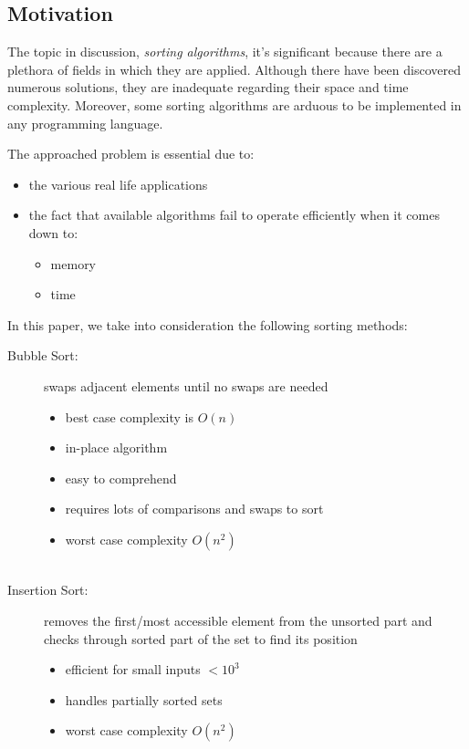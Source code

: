 \documentclass[11pt, letter paper]{article}
\begin{document}
    \subsection{Motivation}
    \label{sec:motiv}
    The topic in discussion, \emph{sorting algorithms}, it's significant because there are a plethora of fields in which they are applied. Although there have been discovered numerous solutions, they are inadequate regarding their space and time complexity. Moreover, some sorting algorithms are arduous to be implemented in any programming language.

    The approached problem is essential due to:
    \renewcommand{\labelitemi}{\ding{43}}
    \renewcommand{\labelitemii}{\ding{45}}
        \begin{itemize}
            \item the various real life applications
            \item the fact that available algorithms fail to operate efficiently when it comes down to:
                \begin{itemize}
                    \item memory
                    \item time
                \end{itemize}
        \end{itemize}

    In this paper, we take into consideration the following sorting methods:
    \begin{description}
        \item[Bubble Sort:] swaps adjacent elements until no swaps are needed
            \begin{itemize}
                \item best case complexity is $O(n)$
                \item in-place algorithm
                \item easy to comprehend
                \item requires lots of comparisons and swaps to sort
                \item worst case complexity $O(n^2)$\\ \\
            \end{itemize}

            \item[Insertion Sort:] removes the first/most accessible element from the unsorted part and checks through sorted part of the set to find its position
            \begin{itemize}
                \item efficient for small inputs $< 10 ^ 3$
                \item handles partially sorted sets
                \item worst case complexity $O(n^2)$
            \end{itemize} 
    \end{description}
\end{document}
